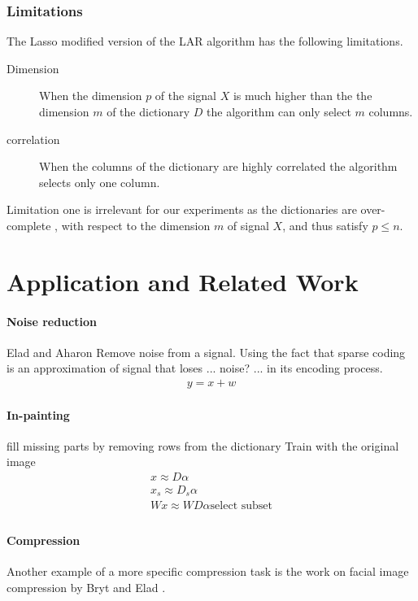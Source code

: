 \subsubsection*{Limitations}
The Lasso modified version of the LAR algorithm has the following limitations.
\begin{description}
 \item[Dimension] When the dimension $p$ of the signal $X$ is much higher than
the the dimension $m$ of the dictionary $D$ the algorithm can only select $m$
columns.
  \item[correlation] When the columns of the dictionary are highly correlated
the algorithm selects only one column.
\end{description}

Limitation one is irrelevant for our experiments as the dictionaries are
over-complete 
, with respect to the dimension $m$ of signal $X$, and thus satisfy $p\leq n$.

\section{Application and Related Work}

\paragraph{Noise reduction}
Elad and Aharon\cite{Elad2006}
Remove noise from a signal. 
Using the fact that sparse coding is an approximation of signal that loses ...
noise? ... in its encoding process. 
\begin{align*}
y = x + w
\end{align*}



\paragraph{In-painting}
fill missing parts by removing rows from the dictionary
Train with the original image
\begin{align*}
x \approx D\alpha\\
x_s \approx D_s\alpha\\
Wx \approx WD\alpha\text{select subset}\\
\end{align*}

\cite{mairal08sparse}

\paragraph{Compression} \cite{Lewicki1999,Murray2006}  
Another example of a more specific compression task is the
work on facial image compression by Bryt and Elad \cite{Bryt2008}.

